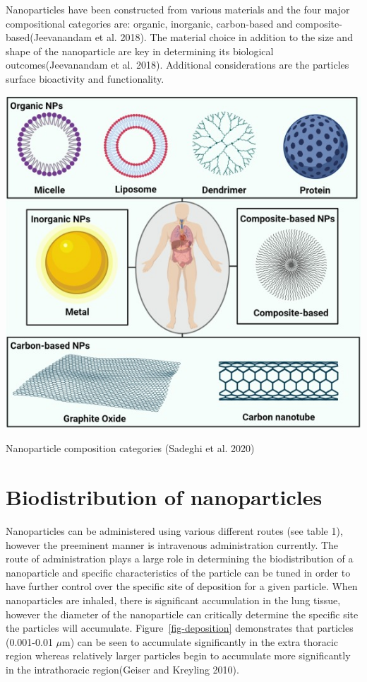 \documentclass[
  letterpaper,
  DIV=11,
  numbers=noendperiod,
  oneside]{scrartcl}
\begin{document}
Nanoparticles have been constructed from various materials and the four
major compositional categories are: organic, inorganic, carbon-based and
composite-based(Jeevanandam et al. 2018). The material choice in
addition to the size and shape of the nanoparticle are key in
determining its biological outcomes(Jeevanandam et al. 2018). Additional
considerations are the particles surface bioactivity and functionality.

\begin{marginfigure}

{\centering \includegraphics{cat-image.jpg}

}

\caption{Nanoparticle composition categories (Sadeghi et al. 2020)}

\end{marginfigure}

\hypertarget{biodistribution-of-nanoparticles}{%
\section{Biodistribution of
nanoparticles}\label{biodistribution-of-nanoparticles}}

Nanoparticles can be administered using various different routes (see
table 1), however the preeminent manner is intravenous administration
currently. The route of administration plays a large role in determining
the biodistribution of a nanoparticle and specific characteristics of
the particle can be tuned in order to have further control over the
specific site of deposition for a given particle. When nanoparticles are
inhaled, there is significant accumulation in the lung tissue, however
the diameter of the nanoparticle can critically determine the specific
site the particles will accumulate. Figure~\ref{fig-deposition}
demonstrates that particles (0.001-0.01 \(\mu\)m) can be seen to
accumulate significantly in the extra thoracic region whereas relatively
larger particles begin to accumulate more significantly in the
intrathoracic region(Geiser and Kreyling 2010).
\end{document}
